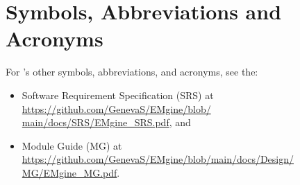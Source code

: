 \section{Symbols, Abbreviations and Acronyms}\label{sec:refs}
For \progname{}'s other symbols, abbreviations, and acronyms, see the:
\begin{itemize}
    \item Software Requirement Specification (SRS) at
    \href{https://github.com/GenevaS/EMgine/blob/main/docs/SRS/EMgine_SRS.pdf}{https://github.com/GenevaS/EMgine/blob/
        \newline main/docs/SRS/EMgine\_SRS.pdf}, and
    \item Module Guide (MG) at
    \href{https://github.com/GenevaS/EMgine/blob/main/docs/Design/MG/EMgine_MG.pdf}{https://github.com/GenevaS/EMgine/blob/main/docs/Design/\newline
     MG/EMgine\_MG.pdf}.
\end{itemize}

